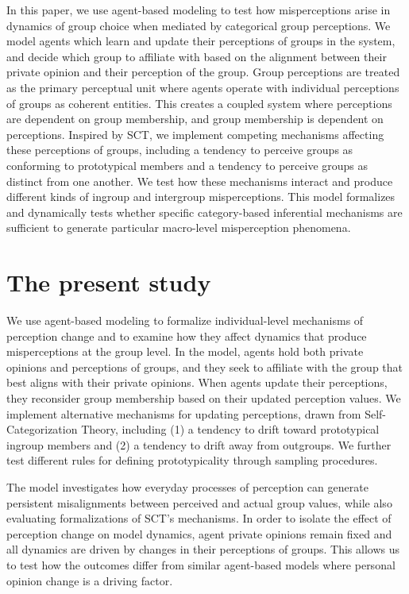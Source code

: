 In this paper, we use agent-based modeling to test how misperceptions arise in dynamics of group choice when mediated by categorical group perceptions. 
We model agents which learn and update their perceptions of groups in the system, and decide which group to affiliate with based on the alignment between their private opinion and their perception of the group.
Group perceptions are treated as the primary perceptual unit where agents operate with individual perceptions of groups as coherent entities. 
This creates a coupled system where perceptions are dependent on group membership, and group membership is dependent on perceptions. 
Inspired by SCT, we implement competing mechanisms affecting these perceptions of groups, including a tendency to perceive groups as conforming to prototypical members and a tendency to perceive groups as distinct from one another.
We test how these mechanisms interact and produce different kinds of ingroup and intergroup misperceptions. 
This model formalizes and dynamically tests whether specific category-based inferential mechanisms are sufficient to generate particular macro-level misperception phenomena. 



\section{The present study}

We use agent-based modeling to formalize individual-level mechanisms of perception change and to examine how they affect dynamics that produce misperceptions at the group level. In the model, agents hold both private opinions and perceptions of groups, and they seek to affiliate with the group that best aligns with their private opinions. When agents update their perceptions, they reconsider group membership based on their updated perception values. 
We implement alternative mechanisms for updating perceptions, drawn from Self-Categorization Theory, including (1) a tendency to drift toward prototypical ingroup members and (2) a tendency to drift away from outgroups. We further test different rules for defining prototypicality through sampling procedures. 

The model investigates how everyday processes of perception can generate persistent misalignments between perceived and actual group values, while also evaluating formalizations of SCT's mechanisms. In order to isolate the effect of perception change on model dynamics, agent private opinions remain fixed and all dynamics are driven by changes in their perceptions of groups. This allows us to test how the outcomes differ from similar agent-based models where personal opinion change is a driving factor. 

